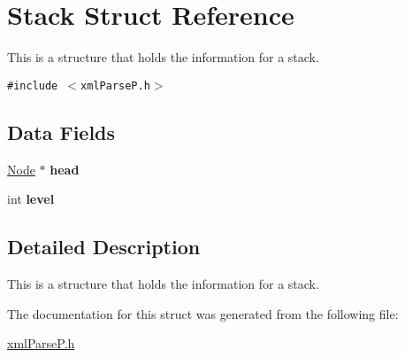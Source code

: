\hypertarget{structStack}{
\section{Stack Struct Reference}
\label{structStack}
}
This is a structure that holds the information for a stack.  


{\tt \#include $<$xmlParseP.h$>$}

\subsection*{Data Fields}
\begin{CompactItemize}
\item 
\hypertarget{structStack_50bfdf880cfde1bf714a7ca9eb1eeae3}{
\hyperlink{structNode}{Node} $\ast$ \textbf{head}}
\label{structStack_50bfdf880cfde1bf714a7ca9eb1eeae3}

\item 
\hypertarget{structStack_980bcca9b29a635b3e70bfdcbb6f1a34}{
int \textbf{level}}
\label{structStack_980bcca9b29a635b3e70bfdcbb6f1a34}

\end{CompactItemize}


\subsection{Detailed Description}
This is a structure that holds the information for a stack. 

The documentation for this struct was generated from the following file:\begin{CompactItemize}
\item 
\hyperlink{xmlParseP_8h}{xmlParseP.h}\end{CompactItemize}
